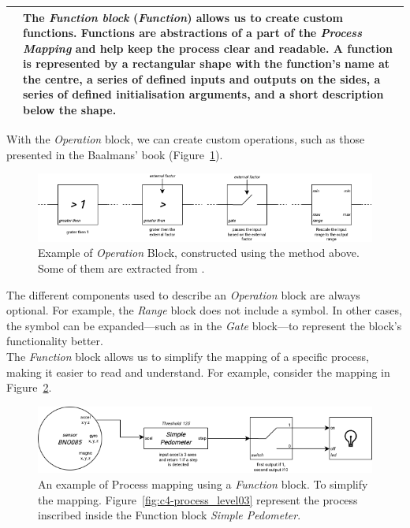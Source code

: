 \begin{longtable}{|m{}|m{}|}
    & 
    The \textit{Function block} (\textit{Function}) allows us to create custom functions. Functions are abstractions of a part of the \textit{Process Mapping} and help keep the process clear and readable. A function is represented by a rectangular shape with the function's name at the centre, a series of defined inputs and outputs on the sides, a series of defined initialisation arguments, and a short description below the shape.
    \\\hline
\end{longtable}
With the \textit{Operation} block, we can create custom operations, such as those presented in the Baalmans’ book \cite{baalman2022composing} (Figure~\ref{fig:c4-process_level}).

\begin{figure}[!h]
    \centering
    \includegraphics[width=1\linewidth]{chapters/4-MDC_model_application/image/bvl-process_level.png}
    \caption{Example of \textit{Operation} Block, constructed using the method above. Some of them are extracted from \cite{baalman2022composing}.}
    \label{fig:c4-process_level}
\end{figure}

The different components used to describe an \textit{Operation} block are always optional. For example, the \textit{Range} block does not include a symbol. In other cases, the symbol can be expanded—such as in the \textit{Gate} block—to represent the block's functionality better.\\
The \textit{Function} block allows us to simplify the mapping of a specific process, making it easier to read and understand. For example, consider the mapping in Figure~\ref{fig:c4-process_level02}.

\begin{figure}[!h]
    \centering
    \includegraphics[width=0.7\linewidth]{chapters/4-MDC_model_application/image/bvl-process_level02.png}
    \caption{An example of Process mapping using a \textit{Function} block. To simplify the mapping. Figure~\ref{fig:c4-process_level03} represent the process inscribed inside the Function block \textit{Simple Pedometer}.}
    \label{fig:c4-process_level02}
\end{figure}

